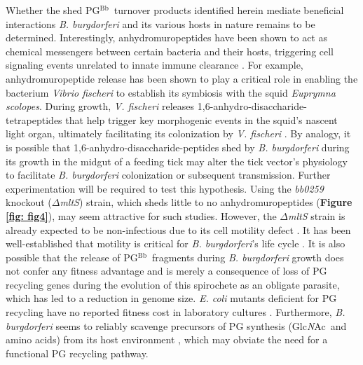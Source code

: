 \documentclass[twoside, watermark]{zHenriquesLab-StyleBioRxiv}
\newcommand{\pgbb}{PG$^\text{Bb}$}
\newcommand{\NAG}{Glc\textit{N}Ac}
\begin{document}
\vspace{1mm}
Whether the shed \pgbb~turnover products identified herein mediate beneficial interactions \textit{B. burgdorferi} and its various hosts in nature remains to be determined. Interestingly, anhydromuropeptides have been shown to act as chemical messengers between certain bacteria and their hosts, triggering cell signaling events unrelated to innate immune clearance \cite{Dworkin2014,Irazoki2019,Jacobs1994}. For example, anhydromuropeptide release has been shown to play a critical role in enabling the bacterium \textit{Vibrio fischeri} to establish its symbiosis with the squid \textit{Euprymna scolopes}. During growth, \textit{V. fischeri} releases 1,6-anhydro-disaccharide-tetrapeptides that help trigger key morphogenic events in the squid’s nascent light organ, ultimately facilitating its colonization by \textit{V. fischeri} \cite{Koropatnick2004}. By analogy, it is possible that 1,6-anhydro-disaccharide-peptides shed by \textit{B. burgdorferi} during its growth in the midgut of a feeding tick may alter the tick vector’s physiology to facilitate \textit{B. burgdorferi} colonization or subsequent transmission. Further experimentation will be required to test this hypothesis. Using the \textit{bb0259} knockout ($\Delta$\textit{mltS}) strain, which sheds little to no anhydromuropeptides (\textbf{Figure \ref{fig: fig4}}), may seem attractive for such studies. However, the $\Delta$\textit{mltS} strain is already expected to be non-infectious due to its cell motility defect \cite{Xu2021}. It has been well-established that motility is critical for \textit{B. burgdorferi}’s life cycle \cite{Li2010,Sultan2013,Sultan2015}. It is also possible that the release of \pgbb~fragments during \textit{B. burgdorferi} growth does not confer any fitness advantage and is merely a consequence of loss of PG recycling genes during the evolution of this spirochete as an obligate parasite, which has led to a reduction in genome size. \textit{E. coli} mutants deficient for PG recycling have no reported fitness cost in laboratory cultures \cite{Jacobs1994}. Furthermore, \textit{B. burgdorferi} seems to reliably scavenge precursors of PG synthesis (\NAG~and amino acids) from its host environment \cite{Barbour1984,DeHart2021}, which may obviate the need for a functional PG recycling pathway.
\end{document}
